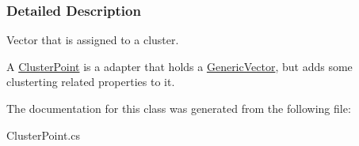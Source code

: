 \subsubsection{Detailed Description}
Vector that is assigned to a cluster. 

A \hyperlink{classDataTools_1_1clustering_1_1ClusterPoint}{Cluster\+Point} is a adapter that holds a \hyperlink{classDataTools_1_1GenericVector}{Generic\+Vector}, but adds some clusterting related properties to it. 

The documentation for this class was generated from the following file\+:\begin{DoxyCompactItemize}
\item 
Cluster\+Point.\+cs\end{DoxyCompactItemize}
